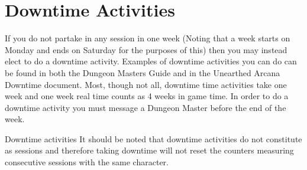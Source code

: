 \section{Downtime Activities}
If you do not partake in any session in one week (Noting that a week starts on Monday and ends on Saturday for the purposes of this) then you may instead elect to do a downtime activity.
\newline
Examples of downtime activities you can do can be found in both the Dungeon Masters Guide and in the Unearthed Arcana Downtime document. Most, though not all, downtime time activities take one week and one week real time counts as 4 weeks in game time. In order to do a downtime activity you must message a Dungeon Master before the end of the week. 
\begin{paperbox}[float=!t]{Downtime activities}
  It should be noted that downtime activities do not constitute as sessions and therefore taking downtime will not reset the counters measuring consecutive sessions with the same character. 
\end{paperbox}